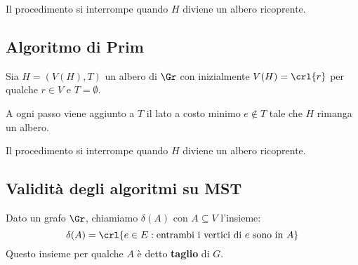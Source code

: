 \documentclass[\main/main.tex]{subfiles}
\begin{document}
Il procedimento si interrompe quando \(H\) diviene un albero ricoprente.

\subsection{Algoritmo di Prim}
Sia \(H = (V(H), T)\) un albero di \(\Gr \) con inizialmente \(V(H) = \crl{r}\) per qualche \(r \in V \) e \(T = \emptyset \).

A ogni passo viene aggiunto a \(T\) il lato a costo minimo \(e \not\in T\) tale che \(H\) rimanga un albero.

Il procedimento si interrompe quando \(H\) diviene un albero ricoprente.

\subsection{Validità degli algoritmi su MST}
\begin{definition}[Taglio]
  Dato un grafo \(\Gr \), chiamiamo \(\delta(A)\) con \(A \subseteq V\) l'insieme:
  \[
    \delta(A) = \crl{e \in E: \text{entrambi i vertici di \(e\) sono in \(A\)}}
  \]
  Questo insieme per qualche \(A\) è detto \textbf{taglio} di \(G\).
\end{definition}
\end{document}
